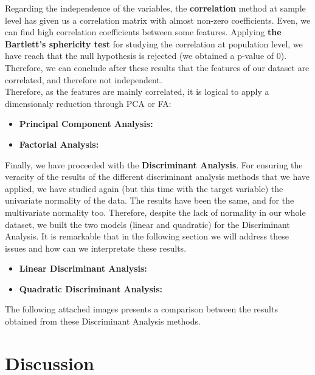 \documentclass[10pt,a4paper]{article}
\theoremstyle{definition}
\theoremstyle{definition}
\begin{document}
Regarding the independence of the variables, the \textbf{correlation} method at sample level has given us a correlation matrix with almost non-zero coefficients. Even, we can find high correlation coefficients between some features. Applying \textbf{the Bartlett's sphericity test} for studying the correlation at population level, we have reach that the null hypothesis is rejected (we obtained a p-value of 0). Therefore, we can conclude after these results that the features of our dataset are correlated, and therefore not independent.  \\

 
Therefore, as the features are mainly correlated, it is logical to apply a dimensionaly reduction through PCA or FA:
\begin{itemize}
	\item \textbf{Principal Component Analysis:}
	
	\item \textbf{Factorial Analysis:}\\
	
\end{itemize} 

Finally, we have proceeded with the \textbf{Discriminant Analysis}. For ensuring the 
veracity of the results of the different discriminant analysis methods that we have applied, we have studied again (but this time with the target variable) the univariate  normality of the data. The results have been the same, and for the multivariate normality too. Therefore, despite the lack of normality in our whole dataset, we built the two models (linear and quadratic) for the Discriminant Analysis. It is remarkable that in the following section we will address these issues and how can we interpretate these results.  

\begin{itemize}
	\item \textbf{Linear Discriminant Analysis:}
	
	\item \textbf{Quadratic Discriminant Analysis:}\\
	
\end{itemize} 

The following attached images presents a comparison between the results obtained from these Discriminant Analysis methods.




\section{Discussion}
\end{document}
